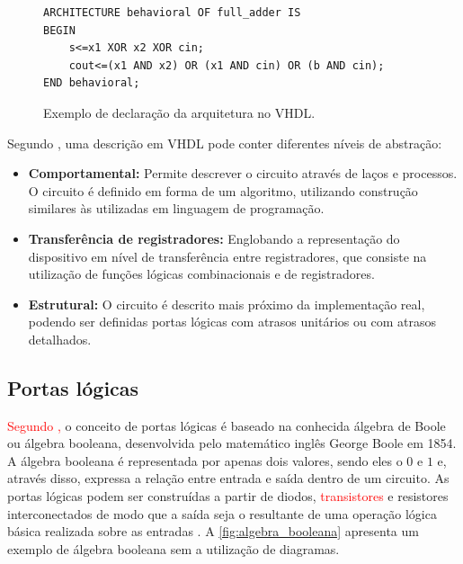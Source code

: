 \begin{figure}[H]
\caption{\label{fig:arquitetura} Exemplo de declaração da arquitetura no VHDL.}
	\begin{center}
    \begin{minipage}{0.7\textwidth}
    \begin{lstlisting}       
ARCHITECTURE behavioral OF full_adder IS
BEGIN
	s<=x1 XOR x2 XOR cin;
    cout<=(x1 AND x2) OR (x1 AND cin) OR (b AND cin);
END behavioral;

\end{lstlisting}
    \end{minipage}
	\end{center}
\end{figure}

\par
Segundo , uma descrição em VHDL pode conter diferentes níveis de abstração:
\begin{itemize}
  \item \textbf{Comportamental:} Permite descrever o circuito através de laços e processos. O circuito é definido em forma de um algoritmo, utilizando construção similares às utilizadas em linguagem de programação.
  
  \item \textbf{Transferência de registradores:} Englobando a representação do dispositivo em nível de transferência entre registradores, que consiste na utilização de funções lógicas combinacionais e de registradores.
  
  \item \textbf{Estrutural:} O circuito é descrito mais próximo da implementação real, podendo ser definidas portas lógicas com atrasos unitários ou com atrasos detalhados.
\end{itemize}

\subsection{Portas lógicas}

\textcolor{red}{Segundo ,} o conceito de portas lógicas é baseado na conhecida álgebra de Boole ou álgebra booleana, desenvolvida pelo matemático inglês George Boole em 1854. A álgebra booleana é representada por apenas dois valores, sendo eles o $0$ e $1$ e, através disso, expressa a relação entre entrada e saída dentro de um circuito. As portas lógicas podem ser construídas a partir de diodos, \textcolor{red}{transistores} e resistores interconectados de modo que a saída seja o resultante de uma operação lógica básica realizada sobre as entradas \cite{tocci2003sistemas}. A \autoref{fig:algebra_booleana} apresenta um exemplo de álgebra booleana sem a utilização de diagramas.


